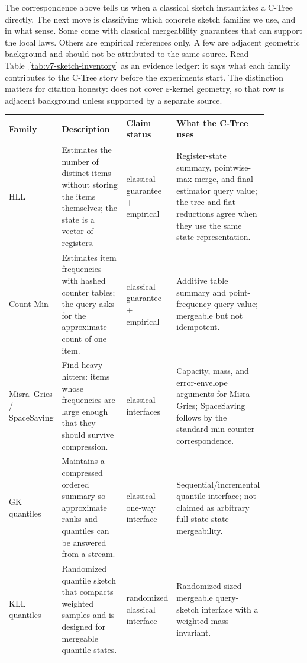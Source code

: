 The correspondence above tells us when a classical sketch instantiates
a C-Tree directly. The next move is classifying which concrete sketch
families we use, and in what sense. Some come with classical
mergeability guarantees that can support the local laws. Others are
empirical references only. A few are adjacent geometric background and
should not be attributed to the same source. Read
Table~\ref{tab:v7-sketch-inventory} as an evidence ledger: it says what
each family contributes to the C-Tree story before the experiments
start. The distinction matters for citation honesty:
\citet{Agarwal2013MergeableTODS} does not cover
\(\varepsilon\)-kernel geometry, so that row is adjacent background
unless supported by a separate source.

\begin{table}[t]
\centering
\scriptsize
\setlength{\tabcolsep}{3pt}
\begin{tabular}{@{}p{0.16\linewidth}p{0.26\linewidth}p{0.18\linewidth}p{0.27\linewidth}@{}}
\toprule
Family & Description & Claim status & What the C-Tree uses \\
\midrule
HLL & Estimates the number of distinct items without storing the items
themselves; the state is a vector of registers. & classical guarantee + empirical & Register-state summary, pointwise-max merge, and final estimator query value; the tree and flat reductions agree when they use the same state representation. \\
Count-Min & Estimates item frequencies with hashed counter tables; the query
asks for the approximate count of one item. & classical guarantee + empirical & Additive table summary and point-frequency query value; mergeable but not idempotent. \\
Misra--Gries / SpaceSaving & Find heavy hitters: items whose frequencies are
large enough that they should survive compression. & classical interfaces & Capacity, mass, and error-envelope arguments for Misra--Gries; SpaceSaving follows by the standard min-counter correspondence. \\
GK quantiles & Maintains a compressed ordered summary so approximate ranks and
quantiles can be answered from a stream. & classical one-way interface & Sequential/incremental quantile interface; not claimed as arbitrary full state-state mergeability. \\
KLL quantiles & Randomized quantile sketch that compacts weighted samples and is
designed for mergeable quantile states. & randomized classical interface & Randomized sized mergeable query-sketch interface with a weighted-mass invariant. \\

\end{tabular}
\end{table}
